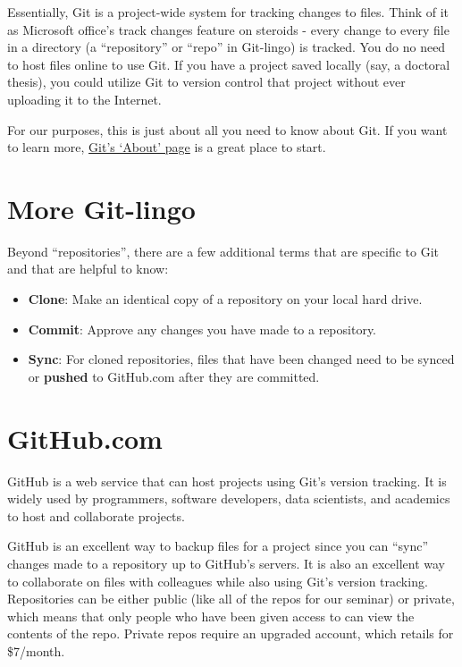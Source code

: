 \documentclass[]{book}
\providecommand{\tightlist}{%
  \setlength{\itemsep}{0pt}\setlength{\parskip}{0pt}}
\begin{document}
Essentially, Git is a project-wide system for tracking changes to files.
Think of it as Microsoft office's track changes feature on steroids -
every change to every file in a directory (a ``repository'' or ``repo''
in Git-lingo) is tracked. You do no need to host files online to use
Git. If you have a project saved locally (say, a doctoral thesis), you
could utilize Git to version control that project without ever uploading
it to the Internet.

For our purposes, this is just about all you need to know about Git. If
you want to learn more, \href{https://git-scm.com/about}{Git's `About'
page} is a great place to start.

\section{More Git-lingo}\label{more-git-lingo}

Beyond ``repositories'', there are a few additional terms that are
specific to Git and that are helpful to know:

\begin{itemize}
\tightlist
\item
  \textbf{Clone}: Make an identical copy of a repository on your local
  hard drive.
\item
  \textbf{Commit}: Approve any changes you have made to a repository.
\item
  \textbf{Sync}: For cloned repositories, files that have been changed
  need to be synced or \textbf{pushed} to GitHub.com after they are
  committed.
\end{itemize}

\section{GitHub.com}\label{github.com}

GitHub is a web service that can host projects using Git's version
tracking. It is widely used by programmers, software developers, data
scientists, and academics to host and collaborate projects.

GitHub is an excellent way to backup files for a project since you can
``sync'' changes made to a repository up to GitHub's servers. It is also
an excellent way to collaborate on files with colleagues while also
using Git's version tracking. Repositories can be either public (like
all of the repos for our seminar) or private, which means that only
people who have been given access to can view the contents of the repo.
Private repos require an upgraded account, which retails for \$7/month.
\end{document}
